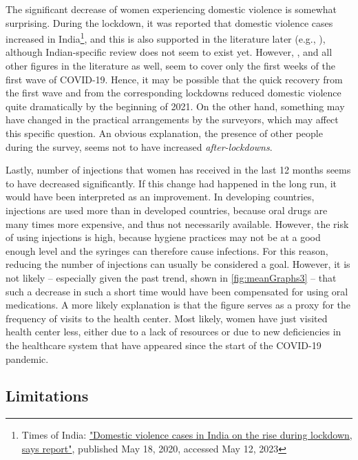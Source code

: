 \documentclass[12pt,a4paper,notitlepage]{article}
\begin{document}
The significant decrease of women experiencing domestic violence is somewhat surprising. During the lockdown, it was reported that domestic violence cases increased in India\footnote{Times of India: \href{https://timesofindia.indiatimes.com/life-style/relationships/love-sex/domestic-violence-cases-in-india-on-the-rise-during-lockdown-says-report/articleshow/75801752.cms}{"Domestic violence cases in India on the rise during lockdown, says report"}, published May 18, 2020, accessed May 12, 2023}, and this is also supported in the literature later (e.g., \citet{Sanches:2020}), although Indian-specific review does not seem to exist yet. However, \citet{Sanches:2020}, and all other figures in the literature as well, seem to cover only the first weeks of the first wave of COVID-19. Hence, it may be possible that the quick recovery from the first wave and from the corresponding lockdowns reduced domestic violence quite dramatically by the beginning of 2021. On the other hand, something may have changed in the practical arrangements by the surveyors, which may affect this specific question. An obvious explanation, the presence of other people during the survey, seems not to have increased \textit{after-lockdowns}.

Lastly, number of injections that women has received in the last 12 months seems to have decreased significantly. If this change had happened in the long run, it would have been interpreted as an improvement. In developing countries, injections are used more than in developed countries, because oral drugs are many times more expensive, and thus not necessarily available. However, the risk of using injections is high, because hygiene practices may not be at a good enough level and the syringes can therefore cause infections. For this reason, reducing the number of injections can usually be considered a goal. However, it is not likely -- especially given the past trend, shown in \cref{fig:meanGraphs3} -- that such a decrease in such a short time would have been compensated for using oral medications. A more likely explanation is that the figure serves as a proxy for the frequency of visits to the health center. Most likely, women have just visited health center less, either due to a lack of resources or due to new deficiencies in the healthcare system that have appeared since the start of the COVID-19 pandemic.

\subsection{Limitations} \label{subsec:limitations}
\end{document}
